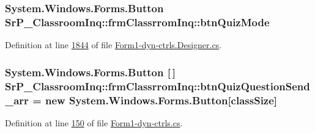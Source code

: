\hypertarget{class_sr_p___classroom_inq_1_1frm_classrrom_inq_aed01a9041d00e0bef6cd7661bc9507d6}{
\subsubsection[{btn\-Quiz\-Mode}]{\setlength{\rightskip}{0pt plus 5cm}\-System.\-Windows.\-Forms.\-Button {\bf \-Sr\-P\-\_\-\-Classroom\-Inq\-::frm\-Classrrom\-Inq\-::btn\-Quiz\-Mode}}}
\label{class_sr_p___classroom_inq_1_1frm_classrrom_inq_aed01a9041d00e0bef6cd7661bc9507d6}


\-Definition at line \hyperlink{_form1-dyn-ctrls_8_designer_8cs_source_l01844}{1844} of file \hyperlink{_form1-dyn-ctrls_8_designer_8cs_source}{\-Form1-\/dyn-\/ctrls.\-Designer.\-cs}.

\hypertarget{class_sr_p___classroom_inq_1_1frm_classrrom_inq_a007012d0330b5c8ad6b29271ddefe7f9}{
\subsubsection[{btn\-Quiz\-Question\-Send\-\_\-arr}]{\setlength{\rightskip}{0pt plus 5cm}\-System.\-Windows.\-Forms.\-Button \mbox{[}$\,$\mbox{]} {\bf \-Sr\-P\-\_\-\-Classroom\-Inq\-::frm\-Classrrom\-Inq\-::btn\-Quiz\-Question\-Send\-\_\-arr} = new \-System.\-Windows.\-Forms.\-Button\mbox{[}{\bf class\-Size}\mbox{]}}}
\label{class_sr_p___classroom_inq_1_1frm_classrrom_inq_a007012d0330b5c8ad6b29271ddefe7f9}


\-Definition at line \hyperlink{_form1-dyn-ctrls_8cs_source_l00150}{150} of file \hyperlink{_form1-dyn-ctrls_8cs_source}{\-Form1-\/dyn-\/ctrls.\-cs}.

